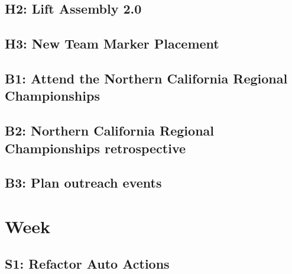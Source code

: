 \documentclass{article}
\begin{document}
\subsection{H2: Lift Assembly 2.0}

\subsection{H3: New Team Marker Placement}

\subsection{B1: Attend the Northern California Regional Championships}

\subsection{B2: Northern California Regional Championships retrospective}

\subsection{B3: Plan outreach events}

\clearpage \newpage \section{Week \thesection} 
\subsection{S1: Refactor Auto Actions}
\end{document}
